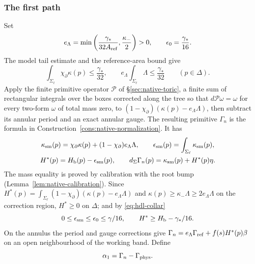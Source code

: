 \subsubsection{The first path}\label{sec:hdl-first}
Set
\begin{equation}\label{eq:hdl-eh}
 e_\Lambda=\min\left(\frac{\gamma_*}{32A_{\rm ref}},\frac{\kappa_-}{2}\right)>0,
 \qquad \epsilon_0=\frac{\gamma_*}{16}.
\end{equation}
The model tail estimate and the reference-area bound give
\begin{equation}\label{eq:hdl-collar}
 \int_{\Sigma_\ell}\chi_\partial\kappa(p)\le\frac{\gamma_*}{32},\qquad
 e_\Lambda\int_{\Sigma_\ell}\Lambda\le\frac{\gamma_*}{32}\qquad(p\in\Delta).
\end{equation}
Apply the finite primitive operator $\mathcal P$ of \S\ref{sec:native-toric}, a finite sum of rectangular integrals over
the boxes corrected along the tree so that $d\mathcal P\omega=\omega$ for every two-form $\omega$ of total mass zero, to
$(1-\chi_\partial)(\kappa(p)-e_\Lambda\Lambda)$, then subtract its annular period and an exact annular gauge.
The resulting primitive $\Gamma_n$ is the formula in Construction~\ref{cons:native-normalization}. It has
\begin{equation}\label{eq:hdl-ksm}
\begin{gathered}
 \kappa_{\rm sm}(p)=\chi_\partial\kappa(p)+(1-\chi_\partial)e_\Lambda\Lambda,\qquad
 \epsilon_{\rm sm}(p)=\int_{\Sigma_\ell}\kappa_{\rm sm}(p),\\
 H^*(p)=H_{\mathrm b}(p)-\epsilon_{\rm sm}(p),\qquad
 d_\Sigma\Gamma_n(p)=\kappa_{\rm sm}(p)+H^*(p)\eta .
\end{gathered}
\end{equation}
The mass equality is proved by calibration with the root bump (Lemma~\ref{lem:native-calibration}). Since
$H^*(p)=\int_{\Sigma_\ell}(1-\chi_\partial)(\kappa(p)-e_\Lambda\Lambda)$ and $\kappa(p)\ge\kappa_-\Lambda\ge2e_\Lambda\Lambda$ on the
correction region, $H^*\ge0$ on $\Delta$; and by \eqref{eq:hdl-collar}
\begin{equation}\label{eq:hdl-budget}
 0\le\epsilon_{\rm sm}\le\epsilon_0\le\gamma/16,\qquad
 H^*\ge H_{\mathrm b}-\gamma_*/16.
\end{equation}
On the annulus the period and gauge corrections give
$\Gamma_n=e_\Lambda\Gamma_{\rm ref}+f(s)H^*(p)\beta$ on an open neighbourhood of the working band. Define
\begin{equation}\label{eq:hdl-alpha1}
 \alpha_1=\Gamma_n-\Gamma_{\rm phys}.
\end{equation}

